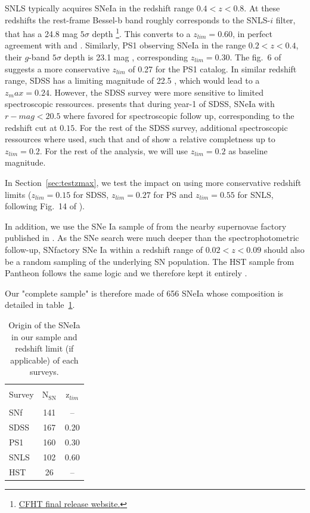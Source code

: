 \documentclass[bibnumber]{aa}
\newcommand{\mr}[1]{{\textcolor[rgb]{0.60,0.10,0.6}{#1}}}
\begin{document}
\mr{SNLS typically acquires SNeIa in the redshift range $0.4<z<0.8$. At these redshifts the rest-frame Bessel-b band roughly corresponds to the SNLS-$i$ filter, that has a 24.8 mag $5\sigma$ depth \footnote{\href{https://www.cfht.hawaii.edu/Science/CFHTLS/cfhtlsfinalreleaseexecsummary.html}{CFHT final release website.}}. This converts to a $z_{lim}=0.60$, in perfect agreement with \citep{neill2006} and \citep{perrett2010}.
Similarly, PS1 observing SNeIa in the range $0.2<z<0.4$, their $g$-band $5\sigma$ depth is 23.1 mag \citep{rest2014}, corresponding $z_{lim}=0.30$.
The fig.~6 of \citep{scolnic2018} suggests a more conservative $z_{lim}$ of 0.27 for the PS1 catalog. In similar redshift range, SDSS has a limiting magnitude of 22.5 \citep{dilday2008,sake2008,sako2014}, which would lead to a $z_max=0.24$. However, the SDSS survey were more sensitive to limited spectroscopic ressources. \cite{kessler2009} presents that during year-1 of SDSS, SNeIa with $r-mag<20.5$ where favored for spectroscopic follow up, corresponding to the redshift cut at $0.15$. For the rest of the SDSS survey, additional spectroscopic ressources where used, such that \cite{kessler2009} and  \cite{dilday2008} of show a relative completness up to $z_{lim}=0.2$. For the rest of the analysis, we will use $z_{lim}=0.2$ as baseline magnitude.}

\mr{In Section~\ref{sec:testzmax}, we test the impact on using more conservative redshift limits ($z_{lim}=0.15$ for SDSS, $z_{lim}=0.27$ for PS and $z_{lim}=0.55$ for SNLS, following Fig.~14 of \citealt{perrett2010}). 
}

In addition, we use the SNe Ia sample of from the nearby supernovae factory
\citep[SNfactory][]{aldering2004} published in \citep{rigault2018}. As the SNe
search were much deeper than the spectrophotometric follow-up, SNfactory SNe Ia
within a redshift range of $0.02<z<0.09$ should also be a random sampling of the
underlying SN population. The HST sample from
Pantheon follows the same logic and we therefore kept it entirely \citep{FIND BACK THE REF}.

Our "complete sample" is therefore made of 656 SNeIa whose composition is
detailed in table~\ref{tab:sample}.


\begin{table}
    \centering
    \caption{Origin of the SNeIa in our sample and redshift limit (if
    applicable) of each surveys.}
    \label{tab:sample}
    \begin{tabular}{l c c}
    \hline\hline\\[-0.8em]
        Survey & N$_{\mathrm{SN}}$  & z$_{lim}$ \\[0.15em]
        \hline\\[-0.8em]
        SNf & 141 & --\\[0.30em]
        SDSS & 167 & 0.20\\[0.30em]
        PS1 & 160 & 0.30 \\[0.30em]        
        SNLS & 102 & 0.60\\[0.30em]
        HST & 26 & --\\[0.30em]
        \hline
    \end{tabular}
\end{table}
\end{document}
